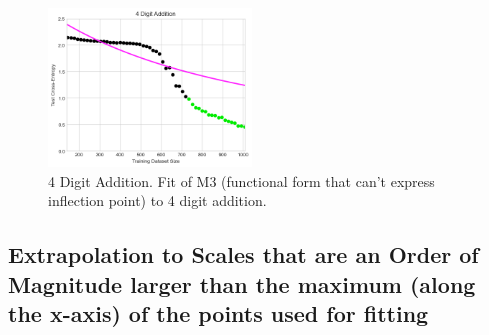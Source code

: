 \documentclass{article} %
\begin{document}

\FloatBarrier

\begin{figure}[htbp]
    \centering
\includegraphics[width=0.48\textwidth]{figures/arithmetic/4_digit_addition__dataset_size__very_first_version__M3.png}

    \caption{
    4 Digit Addition. Fit of M3 (functional form that can't express inflection point) to 4 digit addition.
    }
    \label{fig:M3_addition_failure}
\end{figure}

\FloatBarrier

\fi

\clearpage

\subsection{Extrapolation to Scales that are an Order of Magnitude larger than the maximum (along the x-axis) of the points used for fitting}
\label{section:extrapolate_oom}
\end{document}
